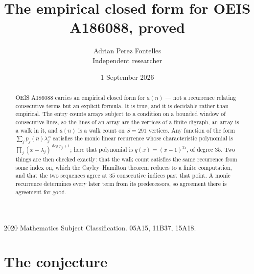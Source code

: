 \documentclass[11pt,a4paper]{article}
\title{The empirical closed form for OEIS A186088, proved}
\author{Adrian Perez Fontelles\\ \small Independent researcher}
\date{1 September 2026}
\theoremstyle{plain}
\theoremstyle{definition}
\begin{document}
\maketitle

\begin{abstract}
OEIS A186088 carries an empirical closed form for $a(n)$ --- not a recurrence relating
consecutive terms but an explicit formula. It is true, and it is decidable rather than
empirical. The entry counts arrays subject to a condition on a bounded window of consecutive lines, so the lines of an array are the
vertices of a finite digraph, an array is a walk in it, and $a(n)$ is a walk count on
$S=291$ vertices. Any function of the form $\sum_j p_j(n)\lambda_j^{\,n}$ satisfies the
monic linear recurrence whose characteristic polynomial is
$\prod_j(x-\lambda_j)^{\deg p_j+1}$; here that polynomial is $q(x)=(x-1)^{35}$, of degree
$35$. Two things are then checked exactly: that the walk count satisfies the same
recurrence from some index on, which the Cayley--Hamilton theorem reduces to a finite
computation, and that the two sequences agree at $35$ consecutive indices past that
point. A monic recurrence determines every later term from its predecessors, so agreement
there is agreement for good.
\end{abstract}

\noindent\small 2020 Mathematics Subject Classification. 05A15, 11B37, 15A18.\normalsize

\section{The conjecture}
\end{document}
